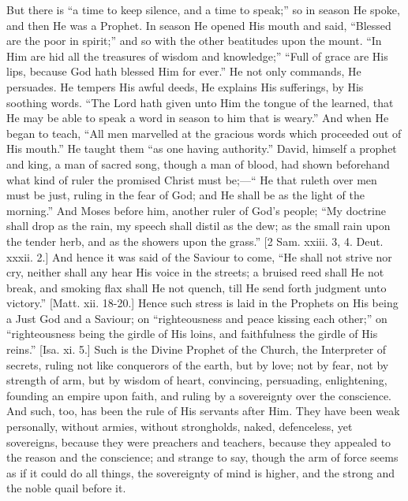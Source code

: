 But there is ``a time to keep silence, and a time to
speak;'' so in season He spoke, and then He was a Prophet. In
season He opened His mouth and said, ``Blessed are the poor in
spirit;'' and so with the other beatitudes upon the mount.
``In Him are hid all the treasures of wisdom and knowledge;''
``Full of grace are His lips, because God hath blessed Him for
ever.'' He not only commands, He persuades. He tempers His awful
deeds, He explains His sufferings, by His soothing words. ``The
Lord hath given unto Him the tongue of the learned, that He may be
able to speak a word in season to him that is weary.'' And when He
began to teach, ``All men marvelled at the gracious words which
proceeded out of His mouth.'' He taught them ``as one having
authority.'' David, himself a prophet and king, a man of sacred
song, though a man of blood, had shown beforehand what kind of ruler
the promised Christ must be;—`` He that ruleth over men must be
just, ruling in the fear of God; and He shall be as the light of the
morning.'' And Moses before him, another ruler of God's people;
``My doctrine shall drop as the rain, my speech shall distil as
the dew; as the small rain upon the tender herb, and as the showers
upon the grass.'' [2 Sam. xxiii. 3, 4. Deut. xxxii. 2.] And hence
it was said of the Saviour to come, ``He shall not strive nor cry,
neither shall any hear His voice in the streets; a bruised reed shall
He not break, and smoking flax shall He not quench, till He send forth
judgment unto victory.'' [Matt. xii. 18-20.] Hence such stress is
laid in the Prophets on His being a Just God and a Saviour; on
``righteousness and peace kissing each other;'' on
``righteousness being the girdle of His loins, and faithfulness
the girdle of His reins.'' [Isa. xi. 5.] Such is the Divine
Prophet of the Church, the Interpreter of secrets, ruling not like
conquerors of the earth, but by love; not by fear, not by strength of
arm, but by wisdom of heart, convincing, persuading, enlightening,
founding an empire upon faith, and ruling by a sovereignty over the
conscience. And such, too, has been the rule of His servants after
Him. They have been weak personally, without armies, without
strongholds, naked, defenceless, yet sovereigns, because they were
preachers and teachers, because they appealed to the reason and the
conscience; and strange to say, though the arm of force seems as if it
could do all things, the sovereignty of mind is higher, and the strong
and the noble quail before it.

